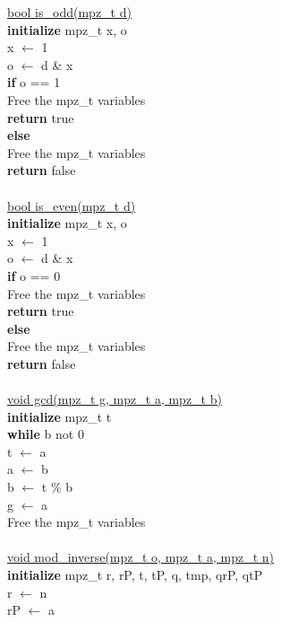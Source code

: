 \documentclass[12pt]{article}
\begin{document}
\underline{bool is\_odd(mpz\_t d)} \\
\indent \textbf{initialize} mpz\_t x, o \\
\indent x $\leftarrow$ 1 \\
\indent o $\leftarrow$ d \& x \\
\indent \textbf{if}  o == 1 \\
\indent \indent Free the mpz\_t variables \\
\indent \indent \textbf{return} true \\
\indent \textbf{else} \\
\indent \indent Free the mpz\_t variables \\
\indent \indent \textbf{return} false \\
\\
\underline{bool is\_even(mpz\_t d)} \\
\indent \textbf{initialize} mpz\_t x, o \\
\indent x $\leftarrow$ 1 \\
\indent o $\leftarrow$ d \& x \\
\indent \textbf{if}  o == 0 \\
\indent \indent Free the mpz\_t variables \\
\indent \indent \textbf{return} true \\
\indent \textbf{else} \\
\indent \indent Free the mpz\_t variables \\
\indent \indent \textbf{return} false \\
\\
\underline{void gcd(mpz\_t g, mpz\_t a, mpz\_t b)} \\
\indent \textbf{initialize} mpz\_t t \\
\indent \textbf{while} b not 0 \\
\indent \indent t $\leftarrow$ a \\
\indent \indent a $\leftarrow$ b \\
\indent \indent b $\leftarrow$ t \% b \\
\indent g $\leftarrow$ a \\
\indent Free the mpz\_t variables \\
\\
\underline{void mod\_inverse(mpz\_t o, mpz\_t a, mpz\_t n)} \\
\indent \textbf{initialize} mpz\_t r, rP, t, tP, q, tmp, qrP, qtP \\
\indent r $\leftarrow$ n \\
\indent rP $\leftarrow$ a \\
\end{document}
